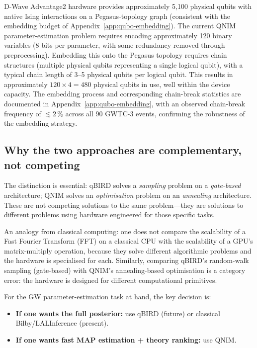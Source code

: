 \documentclass[11pt,a4paper, english]{book}
\theoremstyle{plain}
\theoremstyle{definition}
\numberwithin{equation}{chapter}
\numberwithin{figure}{chapter}
\numberwithin{table}{chapter}
\begin{document}
D-Wave Advantage2 hardware \cite{DWave_2022_hybrid} provides approximately
5{,}100 physical qubits with native Ising interactions on a
Pegasus-topology graph (consistent with the embedding budget of
Appendix~\ref{app:qubo-embedding}). The current QNIM parameter-estimation
problem requires encoding approximately 120 binary variables (8 bits per parameter,
with some redundancy removed through preprocessing). Embedding this onto the
Pegasus topology requires chain structures (multiple physical qubits representing
a single logical qubit), with a typical chain length of 3--5 physical qubits per
logical qubit. This results in approximately $120 \times 4 = 480$ physical qubits
in use, well within the device capacity. The embedding process and corresponding
chain-break statistics are documented in Appendix~\ref{app:qubo-embedding}, with
an observed chain-break frequency of $\lesssim 2\,\%$ across all 90 GWTC-3 events,
confirming the robustness of the embedding strategy.

\subsection{Why the two approaches are complementary, not competing}

The distinction is essential: qBIRD solves a \emph{sampling} problem on a
\emph{gate-based} architecture; QNIM solves an \emph{optimisation} problem on
an \emph{annealing} architecture. These are not competing solutions to the
same problem---they are solutions to different problems using hardware engineered
for those specific tasks.

An analogy from classical computing: one does not compare the scalability of
a Fast Fourier Transform (FFT) on a classical CPU with the scalability of a
GPU's matrix-multiply operation, because they solve different algorithmic
problems and the hardware is specialised for each. Similarly, comparing
qBIRD's random-walk sampling (gate-based) with QNIM's annealing-based
optimisation is a category error: the hardware is designed for different
computational primitives.

For the GW parameter-estimation task at hand, the key decision is:
\begin{itemize}
  \item \textbf{If one wants the full posterior:} use qBIRD (future) or classical
        Bilby/LALInference (present).
  \item \textbf{If one wants fast MAP estimation + theory ranking:} use QNIM.
\end{itemize}
\end{document}
